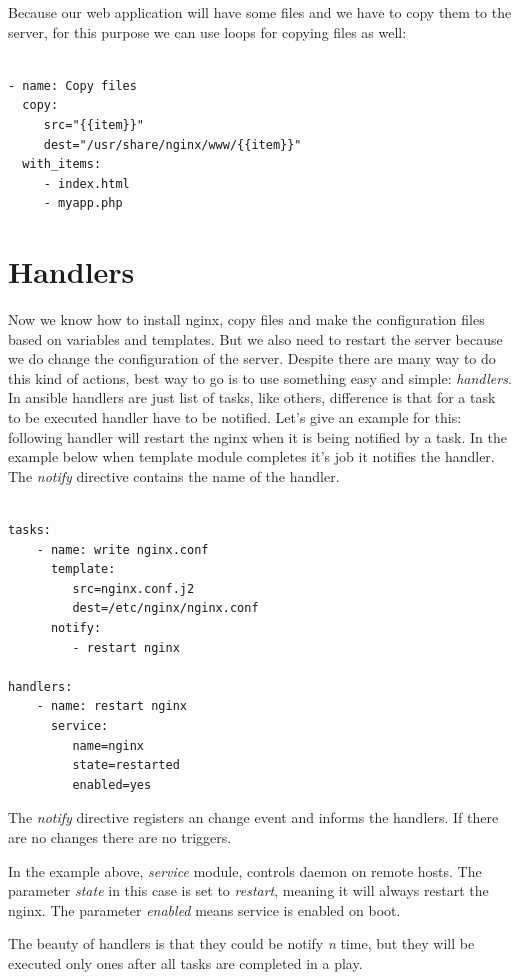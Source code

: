 \documentclass[10pt]{book}
\begin{document}
Because our web application will have some files and we have to copy them to the 
server, for this purpose we can use loops for copying files as well:

\begin{Verbatim} 

- name: Copy files
  copy: 
     src="{{item}}"
     dest="/usr/share/nginx/www/{{item}}"
  with_items:
     - index.html 
     - myapp.php

\end{Verbatim}



\section{Handlers}
Now we know how to install nginx, copy files and make the configuration files based on variables and templates. 
But we also need to restart the server because we do change the configuration of 
the server. Despite there are many way to do this kind of actions, best way to 
go is to use something easy and simple: \emph{handlers}. In ansible handlers are just list of 
tasks, like others, difference is that for a task to be executed handler have to 
be notified. Let's give an example for this: following handler 
will restart the nginx when it is being notified by a task. In the example below 
when template module completes it's job it notifies the handler. The \emph{notify}
directive contains the name of the handler.

\begin{Verbatim} 

tasks:  
    - name: write nginx.conf
      template: 
         src=nginx.conf.j2
         dest=/etc/nginx/nginx.conf
      notify:
         - restart nginx
     
handlers:
    - name: restart nginx
      service: 
         name=nginx
         state=restarted
         enabled=yes

\end{Verbatim}

The \emph{notify} directive registers an change event and informs the handlers. 
If there are no changes there are no triggers.

In the example above, \emph{service} module, controls daemon on remote hosts. 
The parameter \emph{state} in this case is set to \emph{restart}, meaning it will always restart the nginx.
The parameter \emph{enabled} means service is enabled on boot.

The beauty of handlers is that they could be notify \emph{n} time, but they will be 
executed only ones after all tasks are completed in a play.
\end{document}

